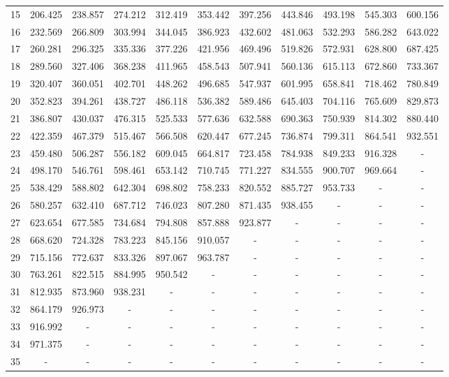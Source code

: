 \documentclass[12pt,twoside]{reedthesis}
\begin{document}
\begin{table}[h]
\begin{tabular}{c|cccccccccc}
		15	& 206.425	& 238.857	& 274.212	& 312.419	& 353.442	& 397.256	& 443.846	& 493.198	& 545.303	& 600.156\\
		16	& 232.569	& 266.809	& 303.994	& 344.045	& 386.923	& 432.602	& 481.063	& 532.293	& 586.282	& 643.022\\
		17	& 260.281	& 296.325	& 335.336	& 377.226	& 421.956	& 469.496	& 519.826	& 572.931	& 628.800	& 687.425\\
		18	& 289.560	& 327.406	& 368.238	& 411.965	& 458.543	& 507.941	& 560.136	& 615.113	& 672.860	& 733.367\\
		19	& 320.407	& 360.051	& 402.701	& 448.262	& 496.685	& 547.937	& 601.995	& 658.841	& 718.462	& 780.849\\
		20	& 352.823	& 394.261	& 438.727	& 486.118	& 536.382	& 589.486	& 645.403	& 704.116	& 765.609	& 829.873\\
		21	& 386.807	& 430.037	& 476.315	& 525.533	& 577.636	& 632.588	& 690.363	& 750.939	& 814.302	& 880.440\\
		22	& 422.359	& 467.379	& 515.467	& 566.508	& 620.447	& 677.245	& 736.874	& 799.311	& 864.541	& 932.551\\
		23	& 459.480	& 506.287	& 556.182	& 609.045	& 664.817	& 723.458	& 784.938	& 849.233	& 916.328	& -\\
		24	& 498.170	& 546.761	& 598.461	& 653.142	& 710.745	& 771.227	& 834.555	& 900.707	& 969.664	& -\\
		25	& 538.429	& 588.802	& 642.304	& 698.802	& 758.233	& 820.552	& 885.727	& 953.733	& -	& -\\
		26	& 580.257	& 632.410	& 687.712	& 746.023	& 807.280	& 871.435	& 938.455	& -	& -	& -\\
		27	& 623.654	& 677.585	& 734.684	& 794.808	& 857.888	& 923.877	& -	& -	& -	& -\\
		28	& 668.620	& 724.328	& 783.223	& 845.156	& 910.057	& -	& -	& -	& -	& -\\
		29	& 715.156	& 772.637	& 833.326	& 897.067	& 963.787	& -	& -	& -	& -	& -\\
		30	& 763.261	& 822.515	& 884.995	& 950.542	& -	& -	& -	& -	& -	& -\\
		31	& 812.935	& 873.960	& 938.231	& -	& -	& -	& -	& -	& -	& -\\
		32	& 864.179	& 926.973	& -	& -	& -	& -	& -	& -	& -	& -\\
		33	& 916.992	& -	& -	& -	& -	& -	& -	& -	& -	& -\\
		34	& 971.375	& -	& -	& -	& -	& -	& -	& -	& -	& -\\
		35	& -	& -	& -	& -	& -	& -	& -	& -	& -	& -
	
	\end{tabular}
\end{table}
\end{document}
